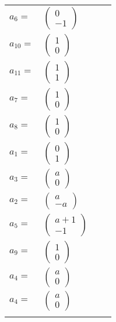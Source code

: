 \documentclass[1p]{elsarticle_modified}
\theoremstyle{definition}
\begin{document}
\begin{tabular}{m{7pt} m{180pt} m{7pt} m{180pt} }
\flushright $a_{6}=$&$\begin{pmatrix}0\\-1\end{pmatrix}$ \\
\flushright $a_{10}=$&$\begin{pmatrix}1\\0\end{pmatrix}$ \\
\flushright $a_{11}=$&$\begin{pmatrix}1\\1\end{pmatrix}$ \\
\flushright $a_{7}=$&$\begin{pmatrix}1\\0\end{pmatrix}$ \\
\flushright $a_{8}=$&$\begin{pmatrix}1\\0\end{pmatrix}$ \\
\flushright $a_{1}=$&$\begin{pmatrix}0\\1\end{pmatrix}$ \\
\flushright $a_{3}=$&$\begin{pmatrix}a\\0\end{pmatrix}$ \\
\flushright $a_{2}=$&$\begin{pmatrix}a\\- a\end{pmatrix}$ \\
\flushright $a_{5}=$&$\begin{pmatrix}a+1\\-1\end{pmatrix}$ \\
\flushright $a_{9}=$&$\begin{pmatrix}1\\0\end{pmatrix}$ \\
\flushright $a_{4}=$&$\begin{pmatrix}a\\0\end{pmatrix}$\\ \flushright $a_{4}=$&$\begin{pmatrix}a\\0\end{pmatrix}$\\&\end{tabular}
\end{document}
